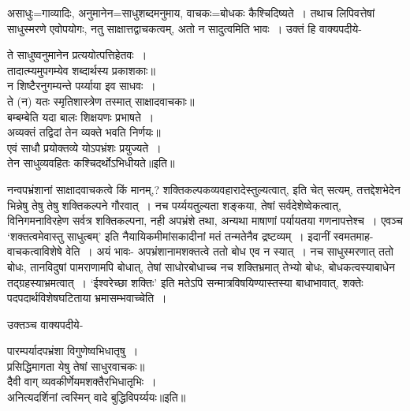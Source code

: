 {{{{ असाधुः=गाव्यादिः, अनुमानेन=साधुशब्दमनुमाय, वाचकः=बोधकः कैश्चिदिष्यते~।
तथाच लिपिवत्तेषां साधुस्मरणे एवोपयोगः, नतु साक्षात्तद्वाचकत्वम्, अतो न सादुत्वमिति भावः~।
उक्तं हि वाक्यपदीये-
\begin{center} ते साधुष्वनुमानेन प्रत्ययोत्पत्तिहेतवः~।\\
 तादात्म्यमुपगम्येव शब्दार्थस्य प्रकाशकाः॥\\[10pt]
 न शिष्टैरनुगम्यन्ते पर्य्याया इव साधवः~।\\
 ते (न) यतः स्मृतिशास्त्रेण तस्मात् साक्षादवाचकाः॥\\[10pt]
 बम्बम्बेति यदा बालः शिक्षयणः प्रभाषते~।\\
 अव्यक्तं तद्विदां तेन व्यक्ते भवति निर्णयः॥\\[10pt]
 एवं साधौ प्रयोक्तव्ये योऽपभ्रंशः प्रयुज्यते~।\\
 तेन साधुव्यवहितः कश्चिदर्थोऽभिधीयते॥इति॥\end{center}

 नन्वपभ्रंशानां साक्षादवाचकत्वे किं मानम्,? शक्तिकल्पकव्यवहारादेस्तुल्यत्वात्, इति चेत् सत्यम्, तत्तद्देशभेदेन भिन्नेषु तेषु तेषु शक्तिकल्पने गौरवात्~।
नच पर्य्ययतुल्यता शङ्कया, तेषां सर्वदेशेष्वेकत्वात्, विनिगमनाविरहेण सर्वत्र शक्तिकल्पना, नही अपभ्रंशे तथा, अन्यथा माषाणां पर्यायतया गणनापत्तेश्च~।
एवञ्च `शक्तत्वमेवास्तु साधुत्बम्' इति नैयायिकमीमांसकादीनां मतं तन्मतेनैव द्रष्टव्यम्~।
 इदानीं स्वमतमाह- वाचकत्वाविशेषे वेति~।
अयं भावः- अपभ्रंशानामशक्तत्वे ततो बोध एव न स्यात्~।
नच साधुस्मरणात् ततो बोधः, तानविदुषां पामराणामपि बोधात्, तेषां साधोरबोधाच्च नच शक्तिभ्रमात् तेभ्यो बोधः, बोधकत्वस्याबाधेन तद्ग्रहस्याभ्रमत्वात्~।
`ईश्वरेच्छा शक्तिः' इति मतेऽपि सन्मात्रविषयिण्यास्तस्या बाधाभावात्, शक्तेः पदपदार्थविशेषघटिताया भ्रमासम्भवाच्चेति~।

उक्तञ्च वाक्यपदीये-
\begin{center} पारम्पर्यादपभ्रंशा विगुणेष्वभिधातृषु~।\\
 प्रसिद्धिमागता येषु तेषां साधुरवाचकः॥\\[10pt]
 दैवी वाग् व्यवकीर्णेयमशक्तैरभिधातृभिः~।\\
 अनित्यदर्शिनां त्वस्मिन् वादे बुद्धिविपर्य्ययः॥इति॥\end{center}

}}}}
